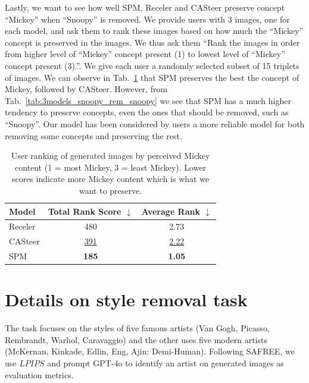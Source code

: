 Lastly, we want to see how well SPM, Receler and CASteer preserve concept ``Mickey'' when ``Snoopy'' is removed. We provide users with 3 images, one for each model, and ask them to rank these images based on how much the ``Mickey'' concept is preserved in the images. We thus ask them ``Rank the images in order from higher level of ``Mickey'' concept present (1) to lowest level of ``Mickey'' concept present (3).''. We give each user a randomly selected subset of 15 triplets of images. We can observe in Tab.~\ref{tab:3models_mickey_rem_snoopy} that SPM preserves the best the concept of Mickey, followed by CASteer. However, from Tab.~\ref{tab:3models_snoopy_rem_snoopy} we see that SPM has a much higher tendency to preserve concepts, even the ones that should be removed, such as ``Snoopy''. Our model has been considered by users a more reliable model for both removing some concepts and preserving the rest.

\begin{table}[h!]
\centering
\caption{User ranking of generated images by perceived Mickey content 
(1 = most Mickey, 3 = least Mickey). Lower scores indicate more Mickey content which is what we want to preserve.}
\label{tab:3models_mickey_rem_snoopy}
\begin{tabular}{lcc}
\hline
\textbf{Model} & \textbf{Total Rank Score $\downarrow$} & \textbf{Average Rank $\downarrow$}\\
\hline
Receler & 480 & 2.73 \\
CASteer & \underline{391} & \underline{2.22} \\
SPM & \textbf{185} & \textbf{1.05} \\
\hline
\end{tabular}
\end{table}


\clearpage

\section{Details on style removal task}
\label{sec:details_style_removal}
The task focuses on the styles of five famous artists (Van Gogh, Picasso, Rembrandt, Warhol, Caravaggio) and the other uses five modern artists (McKernan, Kinkade, Edlin, Eng, Ajin: Demi-Human). Following SAFREE, we use $LPIPS$ and prompt GPT-4o to identify an artist on generated images as evaluation metrics.

